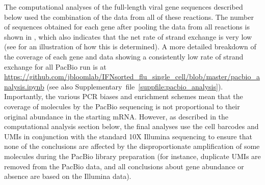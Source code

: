 \documentclass[9pt,lineno]{elife}
\begin{document}
The computational analyses of the full-length viral gene sequences described below used the combination of the data from all of these reactions.
The number of sequences obtained for each gene after pooling the data from all reactions is shown in , which also indicates that the net rate of strand exchange is very low (see  for an illustration of how this is determined).
A more detailed breakdown of the coverage of each gene and data showing a consistently low rate of strand exchange for all PacBio run is at \url{https://github.com/jbloomlab/IFNsorted_flu_single_cell/blob/master/pacbio_analysis.ipynb} (see also Supplementary~file~\ref{suppfile:pacbio_analysis}).
Importantly, the various PCR biases and enrichment schemes mean that the coverage of molecules by the PacBio sequencing is not proportional to their original abundance in the starting mRNA.
However, as described in the computational analysis section below, the final analyses use the cell barcodes and UMIs in conjunction with the standard 10X Illumina sequencing to ensure that none of the conclusions are affected by the disproportionate amplification of some molecules during the PacBio library preparation (for instance, duplicate UMIs are removed from the PacBio data, and all conclusions about gene abundance or absence are based on the Illumina data).
\end{document}
